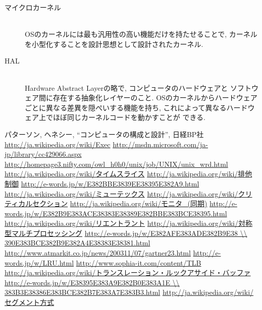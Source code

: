 \documentclass[a4paper, twocolumn]{jarticle}
\begin{document}
\begin{description}
  \item[マイクロカーネル]\mbox{ }\\
    OSのカーネルには最も汎用性の高い機能だけを持たせることで, 
    カーネルを小型化することを設計思想として設計されたカーネル. 
    \cite{ref:micro-kernel}
  \item[HAL]\mbox{ }\\
    Hardware Abstract Layerの略で, コンピュータのハードウェアと
    ソフトウェア間に存在する抽象化レイヤーのこと. 
    OSのカーネルからハードウェアごとに異なる差異を隠ぺいする機能を持ち, 
    これによって異なるハードウェア上でほぼ同じカーネルコードを動かすことが
    できる. \cite{ref:hal}
\end{description}

\begin{thebibliography}{9}
   パターソン, ヘネシー, ``コンピュータの構成と設計'', 日経BP社
   \url{http://ja.wikipedia.org/wiki/Exec}
   \url{http://msdn.microsoft.com/ja-jp/library/cc429066.aspx}
   \url{http://homepage3.nifty.com/owl_h0h0/unix/job/UNIX/unix_wrd.html}
   \url{http://ja.wikipedia.org/wiki/タイムスライス}
   \url{http://ja.wikipedia.org/wiki/排他制御}
   \url{http://e-words.jp/w/E382BBE3839EE38395E382A9.html}
   \url{http://ja.wikipedia.org/wiki/ミューテックス}
   \url{http://ja.wikipedia.org/wiki/クリティカルセクション}
   \url{http://ja.wikipedia.org/wiki/モニタ_(同期)}
   \url{http://e-words.jp/w/E382B9E383ACE38383E38389E382BBE383BCE38395.html}
   \url{http://ja.wikipedia.org/wiki/リエントラント}
   \url{http://ja.wikipedia.org/wiki/対称型マルチプロセッシング}
   \url{http://e-words.jp/w/E382AFE383ADE382B9E38  \\  
  390E383BCE382B9E382A4E38383E38381.html}
   \url{http://www.atmarkit.co.jp/news/200311/07/gartner23.html}
   \url{http://e-words.jp/w/LRU.html}
   \url{http://www.sophia-it.com/content/TLB}
   \url{http://ja.wikipedia.org/wiki/トランスレーション・ルックアサイド・バッファ}
   \url{http://e-words.jp/w/E38395E383A9E382B0E383A1E  \\  
  383B3E38386E383BCE382B7E383A7E383B3.html}
   \url{http://ja.wikipedia.org/wiki/セグメント方式}

\end{thebibliography}
\end{document}
